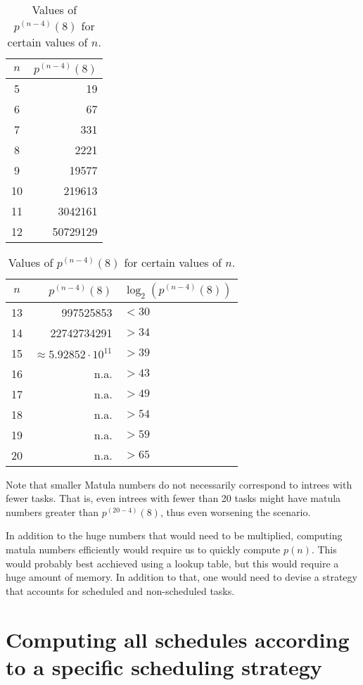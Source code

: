 \begin{description}
\begin{table}[th]
  \centering
  \begin{tabular}[ht]{cr}
    $n$ & $p^{(n-4)}(8)$ \\
    \hline
    5 & 19 \\
    6 & 67 \\
    7 & 331 \\
    8 & 2221 \\
    9 & 19577 \\
    10 & 219613 \\
    11 & 3042161 \\
    12 & 50729129 \\
  \end{tabular}
  \quad
  \begin{tabular}[ht]{crl}
    $n$ & $p^{(n-4)}(8)$ & $\log_2\left( p^{(n-4)}(8) \right)$ \\
    \hline13 & 997525853 & $<30$\\
    14 & 22742734291 & $>34$ \\
    15 & $\approx 5.92852 \cdot 10^{11}$ & $> 39$ \\
    16 & n.a. & $> 43$ \\
    17 & n.a. & $> 49$ \\
    18 & n.a. & $> 54$ \\
    19 & n.a. & $> 59$ \\
    20 & n.a. & $> 65$ \\
  \end{tabular}
  \caption{Values of $p^{(n-4)}(8)$ for certain values of $n$.}
  \label{tab:certain-values-pn-2-3-growth}
\end{table}

Note that smaller Matula numbers do not necessarily correspond to intrees with fewer tasks. That is, even intrees with fewer than 20 tasks might have matula numbers greater than $p^{(20-4)}(8)$, thus even worsening the scenario. 

In addition to the huge numbers that would need to be multiplied, computing matula numbers efficiently would require us to quickly compute $p(n)$. This would probably best acchieved using a lookup table, but this would require a huge amount of memory. In addition to that, one would need to devise a strategy that accounts for scheduled and non-scheduled tasks.

\end{description}

\section{Computing all schedules according to a specific scheduling strategy}
\label{sec:implementation-computing-all-schedules}

